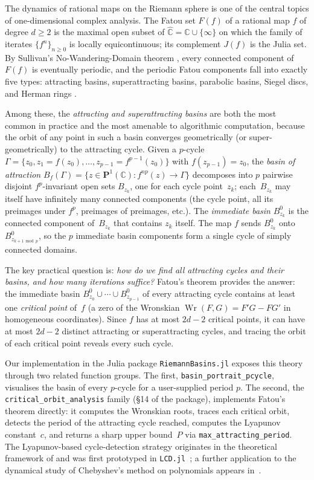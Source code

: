 \documentclass[12pt]{article}
\theoremstyle{definition}
\newcommand{\C}{\mathbb{C}}
\newcommand{\Chat}{\hat{\C}}
\newcommand{\Pone}{\mathbf{P}^1(\C)}
\newcommand{\Ff}{F(f)}
\newcommand{\Jf}{J(f)}
\newcommand{\Bf}{B_f}
\DeclareMathOperator{\Wron}{Wr}
\begin{document}
The dynamics of rational maps on the Riemann sphere is one of the central
topics of one-dimensional complex analysis.  The Fatou set $\Ff$ of a
rational map $f$ of degree $d\geq 2$ is the maximal open subset of
$\Chat = \C\cup\{\infty\}$ on which the family of iterates
$\{f^n\}_{n\geq 0}$ is locally equicontinuous; its complement $\Jf$ is
the Julia set.  By Sullivan's No-Wandering-Domain theorem \cite{Sullivan1985},
every connected component of $\Ff$ is eventually periodic, and the periodic
Fatou components fall into exactly five types: attracting basins,
superattracting basins, parabolic basins, Siegel discs, and Herman rings
\cite{Milnor2006}.

Among these, the \emph{attracting and superattracting basins} are both the
most common in practice and the most amenable to algorithmic computation,
because the orbit of any point in such a basin converges geometrically (or
super-geometrically) to the attracting cycle.  Given a $p$-cycle
$\Gamma = \{z_0, z_1=f(z_0), \ldots, z_{p-1}=f^{p-1}(z_0)\}$ with
$f(z_{p-1})=z_0$, the \emph{basin of attraction}
$\Bf(\Gamma) = \{z\in\Pone : f^{np}(z)\to\Gamma\}$ decomposes into
$p$ pairwise disjoint $f^p$-invariant open sets $B_{z_k}$, one for each cycle
point~$z_k$; each~$B_{z_k}$ may itself have infinitely many connected
components (the cycle point, all its preimages under $f^p$, preimages of
preimages, etc.).  The \emph{immediate basin} $B^0_{z_k}$ is the connected
component of~$B_{z_k}$ that contains $z_k$ itself.  The map $f$ sends
$B^0_{z_k}$ onto $B^0_{z_{k+1\bmod p}}$, so the $p$ immediate basin
components form a single cycle of simply connected domains.

The key practical question is: \emph{how do we find all attracting cycles and
their basins, and how many iterations suffice?}  Fatou's theorem
\cite{Fatou1919,Fatou1920} provides the answer: the immediate basin
$B^0_{z_0}\cup\cdots\cup B^0_{z_{p-1}}$ of every attracting cycle contains
at least one \emph{critical point} of~$f$ (a zero of the Wronskian
$\Wron(F,G) = F'G - FG'$ in homogeneous coordinates).  Since $f$ has at
most $2d-2$ critical points, it can have at most $2d-2$ distinct attracting
or superattracting cycles, and tracing the orbit of each critical point
reveals every such cycle.

Our implementation in the Julia package \texttt{RiemannBasins.jl}
\cite{RiemannBasins} exposes this theory through two related function groups.
The first, \texttt{basin\_portrait\_pcycle}, visualises the basin of every
$p$-cycle for a user-supplied period $p$.  The second, the
\texttt{critical\_orbit\_analysis} family (§14 of the package), implements
Fatou's theorem directly: it computes the Wronskian roots, traces each
critical orbit, detects the period of the attracting cycle reached, computes
the Lyapunov constant~$c$, and returns a sharp upper bound~$P$ via
\texttt{max\_attracting\_period}.
The Lyapunov-based cycle-detection strategy originates in the theoretical
framework of \cite{AlvarezAparicio2023} and was first prototyped in
\texttt{LCD.jl}~\cite{LCD2022}; a further application to the dynamical study
of Chebyshev's method on polynomials appears in~\cite{AlvarezAparicio2023MMEHB}.
\end{document}
